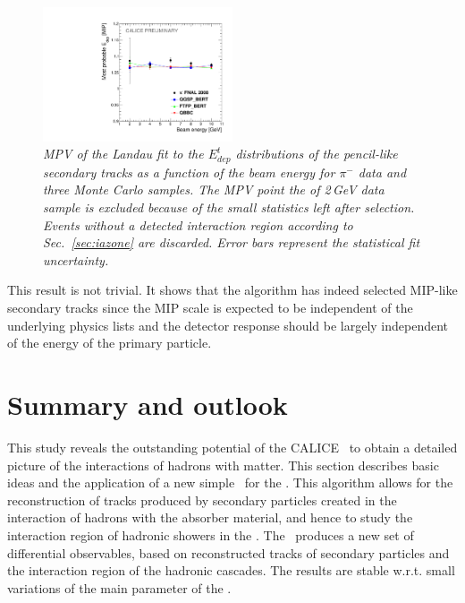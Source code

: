 \begin{figure}
	\centering
	\includegraphics[width=0.5\textwidth]{ECAL/plots/calibrationfit-graph.pdf}
	\caption{\label{fig:calibrationgraph} \sl MPV of the Landau fit to the $E_{dep}^t$ distributions of the pencil-like secondary tracks as a function of the beam energy for $\pi^-$ data and three Monte Carlo samples. The MPV point the of 2\,GeV data sample is excluded because of the small statistics left after selection. Events without a detected interaction region  according to Sec.~\ref{sec:iazone} are discarded.  Error bars represent the statistical fit uncertainty.}
\end{figure}

This result is not trivial. It shows that the algorithm has indeed selected MIP-like secondary tracks since the MIP scale is expected to be independent of the underlying physics lists and the detector response should be largely independent of the energy of the primary particle. 

\section{Summary and outlook}

This study reveals the outstanding potential of the CALICE \ecalp\ to obtain a detailed picture of the interactions of hadrons with matter. 
This section describes basic ideas and the application of a new simple \tfa\ for the \ecal. This algorithm allows for the reconstruction of tracks produced by secondary particles created in the interaction of hadrons with the absorber material, and hence to study the interaction region of hadronic showers in the \ecal. The \tfa\ produces a new set of differential observables, based on reconstructed tracks of secondary particles and the interaction region of the hadronic cascades. The results are stable w.r.t. small variations of the main parameter of the \tfa.

